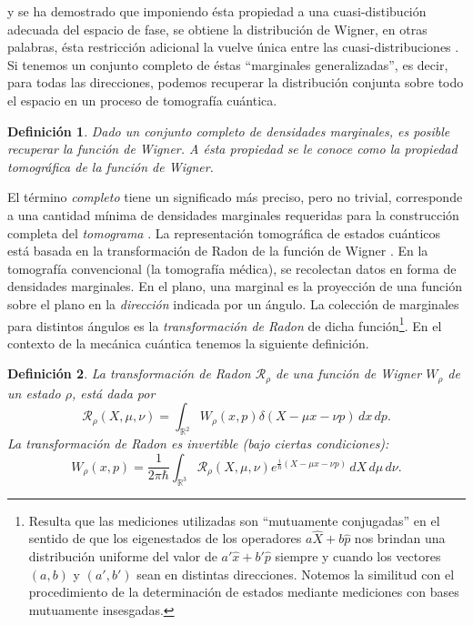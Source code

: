 \documentclass[a4paper]{report}
\DeclareMathOperator{\R}{\mathbb{R}}
\newtheorem{definition}{Definición}
\begin{document}
  y se ha demostrado que imponiendo ésta propiedad a una
  cuasi-distibución adecuada del espacio de fase, se obtiene
  la distribución de Wigner, en otras palabras, ésta
  restricción adicional la vuelve única entre las
  cuasi-distribuciones \cite{ellinas2008}. Si tenemos un
  conjunto completo de éstas ``marginales generalizadas'',
  es decir, para todas las direcciones, podemos recuperar la
  distribución conjunta sobre todo el espacio en un proceso
  de tomografía cuántica.
  \begin{definition}
    \label{def:tomo_prop}
    Dado un conjunto completo de densidades marginales, es
    posible recuperar la función de Wigner. A ésta propiedad
    se le conoce como la propiedad tomográfica de la función
    de Wigner.
  \end{definition}
  El término \textit{completo} tiene un significado más
  preciso, pero no trivial, corresponde a una cantidad
  mínima de densidades marginales requeridas para la
  construcción completa del \textit{tomograma}
  \cite{ibort2009}. La representación tomográfica de estados
  cuánticos está basada en la transformación de Radon de la
  función de Wigner \cite{degosson2022}. En la tomografía
  convencional (la tomografía médica), se recolectan datos
  en forma de densidades marginales. En el plano, una
  marginal es la proyección de una función sobre el plano en
  la \textit{dirección} indicada por un ángulo.  La
  colección de marginales para distintos ángulos es la
  \textit{transformación de Radon} de dicha
  función\footnote{Resulta que las mediciones utilizadas son
    ``mutuamente conjugadas'' en el sentido de que los
    eigenestados de los operadores $a \hat X + b \hat p$ nos
    brindan una distribución uniforme del valor de $a' \hat
    x + b' \hat p$ siempre y cuando los vectores $(a,b)$ y
    $(a',b')$ sean en distintas direcciones. Notemos la
    similitud con el procedimiento de la determinación de
  estados mediante mediciones con bases mutuamente
  insesgadas.}. En el contexto de la mecánica cuántica tenemos
  la siguiente definición. 
  \begin{definition}
    La transformación de Radon $\mathcal R_{\rho}$ de una
    función de Wigner $W_\rho$ de un estado $\rho$, está
    dada por
    \begin{equation}
      \mathcal R_{\rho}\left( X, \mu, \nu \right) 
      = \int_{\R^2} W_\rho(x,p) \delta(X - \mu x - \nu p)
      \, dx \, dp.
    \end{equation}
    La transformación de Radon es invertible (bajo ciertas
    condiciones):
    \begin{equation}
      W_\rho(x,p)
      = \frac{1}{2\pi \hbar}
      \int_{\R^3} \mathcal R_{\rho}(X, \mu, \nu)
      e^{\frac{i}{\hbar}\left( X - \mu x - \nu p \right)} \,
      dX \, d\mu \, d\nu.
    \end{equation}
  \end{definition}
\end{document}
